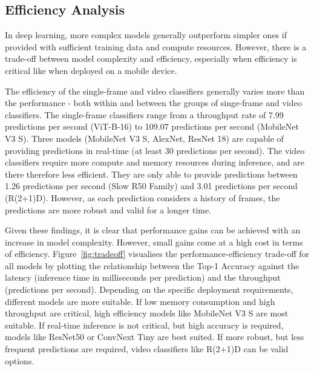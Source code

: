 \documentclass[a4paper]{article}
\begin{document}
\subsection{Efficiency Analysis} %
\label{sub:efficiency}

In deep learning, more complex models generally outperform simpler ones if
provided with sufficient training data and compute resources. However, there is
a trade-off between model complexity and efficiency, especially when efficiency
is critical like when deployed on a mobile device.

The efficiency of the single-frame and video classifiers generally varies more
than the performance - both within and between the groups of singe-frame and
video classifiers. The single-frame classifiers range from a throughput
rate of 7.99 predictions per second (ViT-B-16) to 109.07 predictions per second
(MobileNet V3 S). Three models (MobileNet V3 S, AlexNet, ResNet 18) are capable
of providing predictions in real-time (at least 30 predictions per second). The
video classifiers require more compute and memory resources during inference,
and are there therefore less efficient. They are only able to provide
predictions between 1.26 predictions per second (Slow R50 Family) and 3.01
predictions per second (R(2+1)D). However, as each prediction considers a
history of frames, the predictions are more robust and valid for a longer time.

Given these findings, it is clear that performance gains can be achieved with an
increase in model complexity. However, small gains come at a high cost in terms
of efficiency. Figure~\ref{fig:tradeoff} visualises the performance-efficiency
trade-off for all models by plotting the relationship between the Top-1 Accuracy
against the latency (inference time in milliseconds per prediction) and the
throughput (predictions per second). Depending on the specific deployment
requirements, different models are more suitable. If low memory consumption and
high throughput are critical, high efficiency models like MobileNet V3 S are
most suitable. If real-time inference is not critical, but high accuracy is
required, models like ResNet50 or ConvNext Tiny are best suited. If more robust,
but less frequent predictions are required, video classifiers like R(2+1)D can
be valid options.
\end{document}
